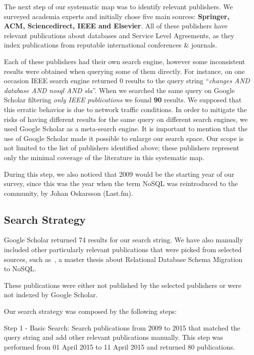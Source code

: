 \documentclass[a4paper]{IEEEtran}
\begin{document}
The next step of our systematic map was to identify relevant publishers. We surveyed academia experts and initially chose five main sources: \textbf{Springer, ACM, Sciencedirect, IEEE and Elsevier}. 
All of these publishers have relevant publications about databases and Service Level Agreements, as they index publications from reputable international conferences \& journals.  

Each of these publishers had their own search engine, however some inconsistent results were obtained when querying some of them directly.
For instance, on one occasion IEEE search engine returned 0 results to the query string ``\textit{changes AND database AND nosql AND sla}''. 
When we searched the same query on Google Scholar filtering \textit{only IEEE publications} we found \textbf{90} results.
We supposed that this erratic behavior is due to network traffic conditions.
In order to mitigate the risks of having different results for the same query on different search engines, we used Google Scholar as a meta-search engine. 
It is important to mention that the use of Google Scholar made it possible to enlarge our search space.
Our scope is not limited to the list of publishers identified above; these publishers represent only the minimal coverage of the literature in this systematic map.

During this step, we also noticed that 2009 would be the starting year of our survey, since this was the year when the term NoSQL was reintroduced to the community, by Johan Oskarsson (Last.fm)\cite{ericevans}.

\subsection{Search Strategy}\label{sec:searchStrategy}

Google Scholar returned 74 results for our search string. We have also manually included other particularly relevant publications that were picked from selected sources, such as~\cite{mastersthesrilinda}, a master thesis about Relational Database Schema Migration to NoSQL.

These publications were either not published by the selected publishers or were not indexed by Google Scholar. 

Our search strategy was composed by the following steps:

Step 1 - Basic Search: Search publications from 2009 to 2015 that matched the query string and add other relevant publications manually. This step was performed from 01 April 2015 to 11 April 2015 and returned 80 publications.
\end{document}
